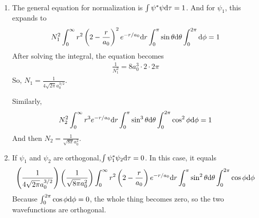 \begin{solution}\
    \begin{enumerate}
        \item The general equation for normalization is $\int\psi^*\psi\mathrm{d}\tau=1$. And for $\psi_1$, this expands to
              \begin{align*}
                  N_{1}^{2}\int_{0}^{\infty}r^{2}\left(2-\frac{r}{a_{0}}\right)^{2}e^{-r/a_{0}}\mathrm{d} r\int_{0}^{\pi}\sin\theta\mathrm{d}
                  \theta\int_{0}^{2\pi}\mathrm{d}\phi=1
              \end{align*}
              After solving the integral, the equation becomes
              \begin{align*}
                  \frac{1}{N_1^2}=8 a_{0}^{3}\cdot 2\cdot 2 \pi
              \end{align*}
              So, $N_1=\frac{1}{4 \sqrt{2 \pi} a_{0}^{3 / 2}}$.

              Similarly,
              \begin{align*}
                  N_{2}^{2}\int_{0}^{\infty}r^{3}e^{-r/a_{0}}\mathrm{d} r\int_{0}^{\pi}\sin^{3}\theta\mathrm{d}\theta\int_{0}^{2\pi}
                  \cos^{2}\phi\mathrm{d}\phi=1
              \end{align*}
              And then $N_2=\frac{1}{\sqrt{8\pi} a_{0}^{2}}$.
        \item If $\psi_1$ and $\psi_2$ are orthogonal,$\int\psi_1^*\psi_2\mathrm{d}\tau=0$. In this case, it equals
              \begin{align*}
                  \left(\frac{1}{4\sqrt{2\pi}a_{0}^{3/2}}\right)\left(\frac{1}{\sqrt{8\pi}a_{0}^{2}}\right)\int_{0}^{\infty}
                  r^{2}\left(2-\frac{r}{a_{0}}\right)e^{-r/a_{0}}\mathrm{d} r\int_{0}^{\pi}\sin^{2}\theta\mathrm{d}\theta\int_{0}^{2\pi}\cos\phi\mathrm{d}\phi
              \end{align*}
              Because $\int_{0}^{2\pi}\cos\phi\mathrm{d}\phi=0$, the whole thing becomes zero, so the two wavefunctions are orthogonal.
    \end{enumerate}
\end{solution}


